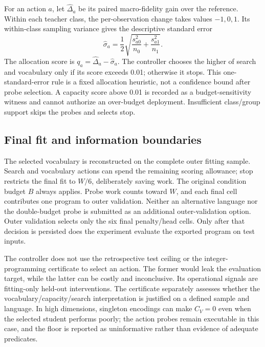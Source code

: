 \documentclass[review,12pt]{elsarticle}
\begin{document}
For an action $a$, let $\widehat\Delta_a$ be its paired macro-fidelity gain over the reference. Within each teacher class, the per-observation change takes values $-1,0,1$. Its within-class sampling variance gives the descriptive standard error
\begin{equation}
 \widehat\sigma_a=\frac12\sqrt{\frac{s_{a0}^2}{n_0}+\frac{s_{a1}^2}{n_1}}.
\end{equation}
The allocation score is $q_a=\widehat\Delta_a-\widehat\sigma_a$. The controller chooses the higher of search and vocabulary only if its score exceeds 0.01; otherwise it stops. This one-standard-error rule is a fixed allocation heuristic, not a confidence bound after probe selection. A capacity score above 0.01 is recorded as a budget-sensitivity witness and cannot authorize an over-budget deployment. Insufficient class/group support skips the probes and selects stop.

\subsection{Final fit and information boundaries}
The selected vocabulary is reconstructed on the complete outer fitting sample. Search and vocabulary actions can spend the remaining scoring allowance; stop restricts the final fit to $W/6$, deliberately saving work. The original condition budget $B$ always applies. Probe work counts toward $W$, and each final cell contributes one program to outer validation. Neither an alternative language nor the double-budget probe is submitted as an additional outer-validation option. Outer validation selects only the six final penalty/head cells. Only after that decision is persisted does the experiment evaluate the exported program on test inputs.

The controller does not use the retrospective test ceiling or the integer-programming certificate to select an action. The former would leak the evaluation target, while the latter can be costly and inconclusive. Its operational signals are fitting-only held-out interventions. The certificate separately assesses whether the vocabulary/capacity/search interpretation is justified on a defined sample and language. In high dimensions, singleton encodings can make $C_V=0$ even when the selected student performs poorly; the action probes remain executable in this case, and the floor is reported as uninformative rather than evidence of adequate predicates.




\end{document}
